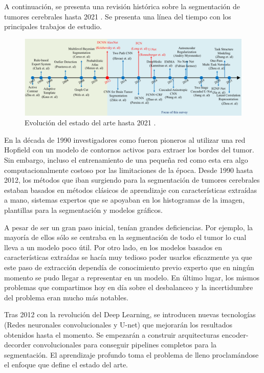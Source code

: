 	A continuación, se presenta una revisión histórica sobre la segmentación de tumores cerebrales hasta 2021 \cite{liu2023deep}. Se presenta una línea del tiempo con los principales trabajos de estudio.
	
	\begin{figure}[H]
		\centering
		\includegraphics[width=1.0\linewidth]{imagenes/evolution_stateofart.png}
		\caption{Evolución del estado del arte hasta 2021 \cite{liu2023deep}.}
	\end{figure}
	
	En la década de 1990 investigadores como \cite{zhu1997computerized} fueron pioneros al utilizar una red Hopfield con un modelo de contornos activos para extraer los bordes del tumor. Sin embargo, incluso el entrenamiento de una pequeña red como esta era algo computacionalmente costoso por las limitaciones de la época.  Desde 1990 hasta 2012, los métodos que iban surgiendo para la segmentación de tumores cerebrales estaban basados en métodos clásicos de aprendizaje con características extraídas a mano, sistemas expertos que se apoyaban en los histogramas de la imagen, plantillas para la segmentación y modelos gráficos. 
	
	A pesar de ser un gran paso inicial, tenían grandes deficiencias. Por ejemplo, la mayoría de ellos sólo se centraba en la segmentación de todo el tumor lo cual lleva a un modelo poco útil. Por otro lado, en los modelos basados en características extraídas se hacía muy tedioso poder usarlos eficazmente ya que este paso de extracción dependía de conocimiento previo experto que en ningún momento se pudo llegar a representar en un modelo. En último lugar, los mismos problemas que compartimos hoy en día sobre el desbalanceo y la incertidumbre del problema eran mucho más notables. 
	
	Tras 2012 con la revolución del Deep Learning, se introducen nuevas tecnologías (Redes neuronales convolucionales y U-net) que mejorarán los resultados obtenidos hasta el momento. 
	Se empezarán a construir arquitecturas encoder-decorder convolucionales para conseguir pipelines completos para la segmentación. El aprendizaje profundo toma el problema de lleno proclamándose el enfoque que define el estado del arte.
	
